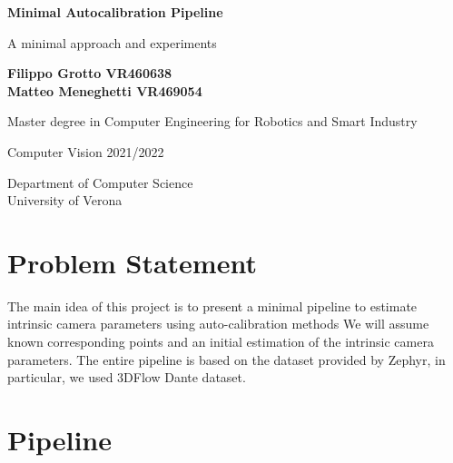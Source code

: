\documentclass[12pt]{article}
\begin{document}
\begin{center}
    \vspace*{1cm}    
    \textbf{\LARGE Minimal Autocalibration Pipeline}

    \vspace{0.5cm}
    A minimal approach and experiments
            
    \vspace{1.5cm}

    \textbf{Filippo Grotto VR460638 \\ Matteo Meneghetti VR469054}

    \vspace{0.5cm}
    Master degree in Computer Engineering for Robotics and Smart Industry

    \vfill
            
    Computer Vision 2021/2022
            
    \vspace{0.8cm}
                
    Department of Computer Science\\
    University of Verona\\
            
\end{center}

\tableofcontents

\newpage
\section{Problem Statement}
The main idea of this project is to present a minimal pipeline to estimate intrinsic camera parameters using auto-calibration methods We will assume known corresponding points and an initial estimation of the intrinsic camera parameters. The entire pipeline is based on the dataset provided by Zephyr, in particular, we used 3DFlow Dante dataset.

\section{Pipeline}
\end{document}

